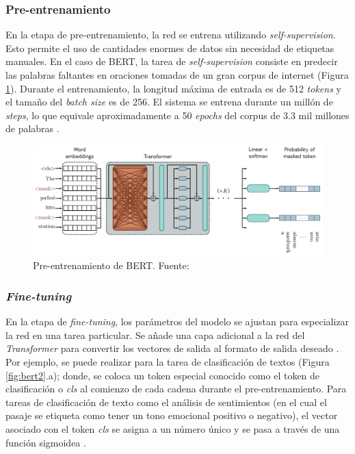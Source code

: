 \subsubsection{Pre-entrenamiento}

En la etapa de pre-entrenamiento, la red se entrena utilizando \textit{self-supervision}. Esto permite el uso de cantidades enormes de datos sin necesidad de etiquetas manuales. En el caso de BERT, la tarea de \textit{self-supervision} consiste en predecir las palabras faltantes en oraciones tomadas de un gran corpus de internet (Figura \ref{fig:bert}). Durante el entrenamiento, la longitud máxima de entrada es de 512 \textit{tokens} y el tamaño del \textit{batch size} es de 256. El sistema se entrena durante un millón de \textit{steps}, lo que equivale aproximadamente a 50 \textit{epochs} del corpus de 3.3 mil millones de palabras \citep{prince2023understanding}.

\begin{figure}[H]
	\centering
	\includegraphics[width=\textwidth]{../img/theory/pre-training}
	\caption{Pre-entrenamiento de BERT. Fuente: \cite{prince2023understanding}}
	\label{fig:bert}
\end{figure}


\subsubsection{\textit{Fine-tuning}}



En la etapa de \textit{fine-tuning}, los parámetros del modelo se ajustan para especializar la red en una tarea particular. Se añade una capa adicional a la red del \textit{Transformer} para convertir los vectores de salida al formato de salida deseado \citep{prince2023understanding}. Por ejemplo, se puede realizar  para la tarea de clasificación de textos (Figura \ref{fig:bert2}.a); donde, se coloca un token especial conocido como el token de clasificación o \textit{cls} al comienzo de cada cadena durante el pre-entrenamiento. Para tareas de clasificación de texto como el análisis de sentimientos (en el cual el pasaje se etiqueta como tener un tono emocional positivo o negativo), el vector asociado con el token \textit{cls} se asigna a un número único y se pasa a través de una función sigmoidea \citep{prince2023understanding}.

